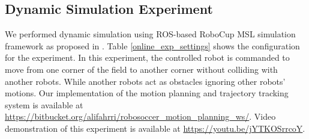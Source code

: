 \documentclass[conference]{IEEEtran}
\begin{document}
%


\subsection{Dynamic Simulation Experiment}
We performed dynamic simulation using ROS-based RoboCup MSL simulation framework as proposed in \cite{yao2015simulation}. Table \ref{online_exp_settings} shows the configuration for the experiment. In this experiment, the controlled robot is commanded to move from one corner of the field to another corner without colliding with another robots. While another robots act as obstacles ignoring other robots' motions. Our implementation of the motion planning and trajectory tracking system is available at \url{https://bitbucket.org/alifahrri/robosoccer_motion_planning_ws/}. Video demonstration of this experiment is available at \url{https://youtu.be/jYTKOSrrcoY}. 
\end{document}
